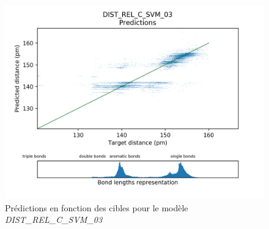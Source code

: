 \begin{figure}
	\centering
	
	\includegraphics[scale=0.8]{../figures/DIST_REL_C_SVM_03/DIST_REL_C_SVM_03_preds_targets.png}	
	
	\caption{Prédictions en fonction des cibles pour le modèle \emph{DIST\_REL\_C\_SVM\_03}}
	
	\label{fpreds_targets_dist_rel_c_svm_01}

	
\end{figure}

